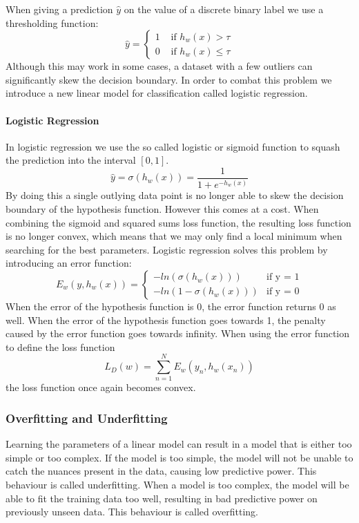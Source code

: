 When giving a prediction $\hat{y}$ on the value of a discrete binary label we use a thresholding function:
\[
\hat{y} = 
\begin{cases}
  1 &\text{ if } h_w(x) > \tau \\
  0 &\text{ if } h_w(x) \leq \tau  
\end{cases}
\] 
Although this may work in some cases, a dataset with a few outliers can significantly skew the decision boundary.
In order to combat this problem we introduce a new linear model for classification called logistic regression.

\paragraph{Logistic Regression}\label{sec:logistic}

In logistic regression we use the so called logistic or sigmoid function to squash the prediction into the interval $[0,1]$.
\[ \hat{y} = \sigma(h_w(x)) = \frac{1}{1+e^{-h_w(x)}} \]
By doing this a single outlying data point is no longer able to skew the decision boundary of the hypothesis function.
However this comes at a cost.
When combining the sigmoid and squared sums loss function, the resulting loss function is no longer convex, which means that we may only find a local minimum when searching for the best parameters.
Logistic regression solves this problem by introducing an error function:
\[E_w(y,h_w(x)) = \begin{cases}
	-ln(\sigma(h_w(x))) &\text{if y = 1}\\	
	-ln(1-\sigma(h_w(x))) &\text{if y = 0}
\end{cases}\]
When the error of the hypothesis function is 0, the error function returns 0 as well. When the error of the hypothesis function goes towards 1, the penalty caused by the error function goes towards infinity.
When using the error function to define the loss function
$$L_D(w) = \sum_{n=1}^N E_w(y_n, h_w(x_n))$$
the loss function once again becomes convex.

\subsubsection{Overfitting and Underfitting}
Learning the parameters of a linear model can result in a model that is either too simple or too complex.
If the model is too simple, the model will not be unable to catch the nuances present in the data, causing low predictive power. This behaviour is called underfitting.
When a model is too complex, the model will be able to fit the training data too well, resulting in bad predictive power on previously unseen data. This behaviour is called overfitting. 

